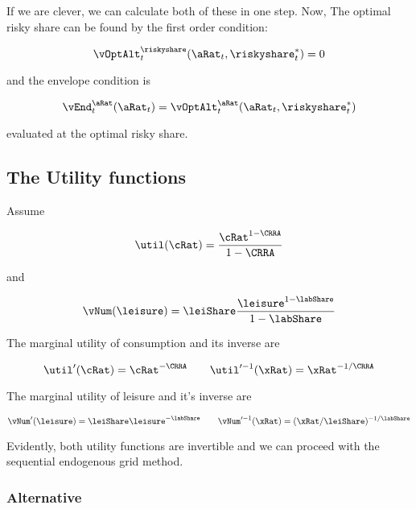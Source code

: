 \documentclass[\econtexRoot/SequentialEGM]{subfiles}
\begin{document}
If we are clever, we can calculate both of these in one step. Now, The optimal risky share can be found by the first order condition:

\begin{equation}
        \vOptAlt_{t}^{\riskyshare}(\aRat_{t}, \riskyshare_{t}^{*})  = 0
\end{equation}

and the envelope condition is

\begin{equation}
        \vEnd_{t}^{\aRat}(\aRat_{t}) = \vOptAlt_{t}^{\aRat}(\aRat_{t}, \riskyshare_{t}^{*})
\end{equation}

evaluated at the optimal risky share.

\subsection{The Utility functions}

Assume

\begin{equation}
        \util(\cRat) = \frac{\cRat^{1-\CRRA}}{1-\CRRA}
\end{equation}

and

\begin{equation}
        \vNum(\leisure) = \leiShare \frac{\leisure^{1-\labShare}}{1-\labShare}
\end{equation}

The marginal utility of consumption and its inverse are

\begin{equation}
        \util'(\cRat) = \cRat^{-\CRRA} \qquad \util'^{-1}(\xRat) =
        \xRat^{-1/\CRRA}
\end{equation}

The marginal utility of leisure and it's inverse are

\begin{equation}
        \vNum'(\leisure) = \leiShare\leisure^{-\labShare} \qquad
        \vNum'^{-1}(\xRat) = (\xRat/\leiShare)^{-1/\labShare}
\end{equation}

Evidently, both utility functions are invertible and we can proceed with the
sequential endogenous grid method.

\subsubsection{Alternative}
\end{document}
